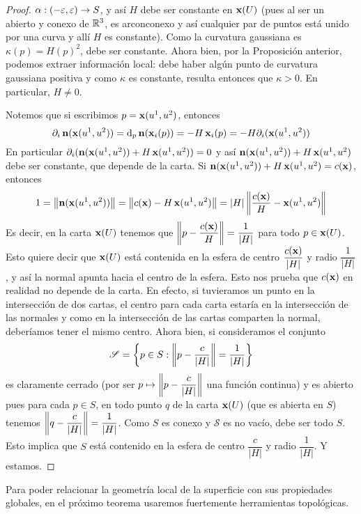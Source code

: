 \begin{teo}
\begin{proof}
$\alpha:(-\varepsilon,\varepsilon)\to S$, y así $H$ debe ser constante en $\operatorname{\mathbf{x}}(U)$ (pues al ser un abierto y conexo de $\mathbb{R}^3$, es arconconexo y así cualquier par de puntos está unido por una curva y allí $H$ es constante). Como la curvatura gaussiana es $\kappa(p)=H(p)^2$, debe ser constante. Ahora bien, por la Proposición anterior, podemos extraer información local: debe haber algún punto de curvatura gaussiana positiva y como $\kappa$ es constante, resulta entonces que $\kappa>0$. En particular, $H\neq 0$.

Notemos que si escribimos $p=\operatorname{\mathbf{x}}(u^1,u^2)$, entonces $$\partial_i\operatorname{\mathbf{n}}(\operatorname{\mathbf{x}}(u^1,u^2)) = \mathop{}\!\mathrm{d}_p\operatorname{\mathbf{n}}(\operatorname{\mathbf{x}}_i(p)) = - H\operatorname{\mathbf{x}}_i(p)=-H\partial_i(\operatorname{\mathbf{x}}(u^1,u^2))$$ En particular $\partial_i(\operatorname{\mathbf{n}}(\operatorname{\mathbf{x}}(u^1,u^2)) + H\operatorname{\mathbf{x}}(u^1,u^2)) = 0$ y así $\operatorname{\mathbf{n}}(\operatorname{\mathbf{x}}(u^1,u^2))+H\operatorname{\mathbf{x}}(u^1,u^2)$ debe ser constante, que depende de la carta. Si $\operatorname{\mathbf{n}}(\operatorname{\mathbf{x}}(u^1,u^2)) +H\operatorname{\mathbf{x}}(u^1,u^2) = c(\operatorname{\mathbf{x}})$, entonces $$1=\left\| \operatorname{\mathbf{n}}(\operatorname{\mathbf{x}}(u^1,u^2)) \right\|=\left\| c(\operatorname{\mathbf{x}}) - H\operatorname{\mathbf{x}}(u^1,u^2) \right\| = |H| \left\| \dfrac{c(\operatorname{\mathbf{x}})}{H}-\operatorname{\mathbf{x}}(u^1,u^2) \right\|$$ Es decir, en la carta $\operatorname{\mathbf{x}}(U)$ tenemos que $\left\| p-\dfrac{c(\operatorname{\mathbf{x}})}{H} \right\|=\dfrac{1}{|H|}$ para todo $p\in\operatorname{\mathbf{x}}(U)$. Esto quiere decir que $\operatorname{\mathbf{x}}(U)$ está contenida en la esfera de centro $\dfrac{c(\operatorname{\mathbf{x}})}{|H|}$ y radio $\dfrac{1}{|H|}$, y así la normal apunta hacia el centro de la esfera. Esto nos prueba que $c(\operatorname{\mathbf{x}})$ en realidad no depende de la carta. En efecto, si tuvieramos un punto en la intersección de dos cartas, el centro para cada carta estaría en la intersección de las normales y como en la intersección de las cartas comparten la normal, deberíamos tener el mismo centro. Ahora bien, si consideramos el conjunto $$\mathscr{S}=\left\{p\in S : \left\| p-\dfrac{c}{|H|} \right\|=\dfrac{1}{|H|}\right\}$$ es claramente cerrado (por ser $p\mapsto \left\| p-\dfrac{c}{|H|} \right\|$ una función continua) y es abierto pues para cada $p\in S$, en todo punto $q$ de la carta $\operatorname{\mathbf{x}}(U)$ (que es abierta en $S$) tenemos $\left\| q-\dfrac{c}{|H|} \right\|=\dfrac{1}{|H|}$. Como $S$ es conexo y $\mathscr{S}$ es no vacío, debe ser todo $S$. Esto implica que $S$ está contenido en la esfera de centro $\dfrac{c}{|H|}$ y radio $\dfrac{1}{|H|}$. Y estamos.
\end{proof}
\end{teo}

Para poder relacionar la geometría local de la superficie con sus propiedades globales, en el próximo teorema usaremos fuertemente herramientas topológicas.

